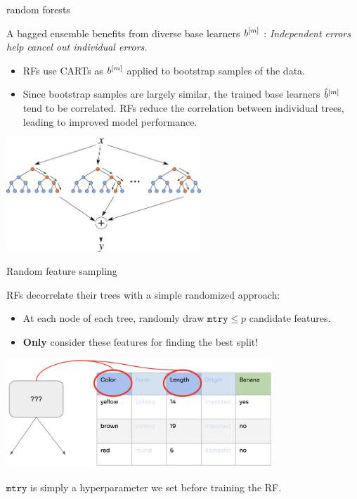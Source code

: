 \documentclass[11pt,compress,t,notes=noshow, xcolor=table]{beamer}
\begin{document}
\begin{vbframe}{random forests }

A bagged ensemble benefits from diverse base learners $b^{[m]}$
: \textit{Independent errors help cancel out individual errors.}

\begin{itemize}
\item RFs use CARTs as $b^{[m]}$ applied to bootstrap samples of the data.
\item Since bootstrap samples are largely similar, the trained base learners $\hat{b}^{[m]}$ tend to be correlated. RFs reduce the correlation between individual trees, leading to improved model performance.

\end{itemize}

\begin{center}
\includegraphics[width=0.55\textwidth]{figure_man/forest.png}
\end{center}

\end{vbframe}


\begin{vbframe}{Random feature sampling}

RFs decorrelate their trees with a simple randomized approach:

\begin{itemize}
  \item At each node of each tree, randomly draw $\texttt{mtry} \le p$ candidate features.
  \item \textbf{Only} consider these features for finding the best split!
\end{itemize}

\begin{center}
\includegraphics[width=0.75\textwidth]{figure_man/forest-feature-sampling.png}
\end{center}

$\texttt{mtry}$ is simply a hyperparameter we set before training the RF.

\end{vbframe}
\end{document}
